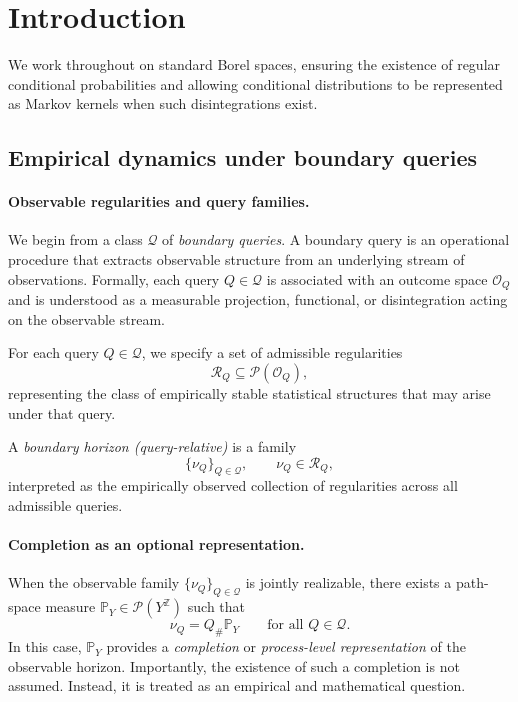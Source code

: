 \documentclass[11pt]{article}
\begin{document}
\tableofcontents

\section{Introduction}

We work throughout on standard Borel spaces, ensuring the existence of regular conditional
probabilities and allowing conditional distributions to be represented as Markov kernels when
such disintegrations exist.

\subsection{Empirical dynamics under boundary queries}

\paragraph{Observable regularities and query families.}
We begin from a class $\mathcal Q$ of \emph{boundary queries}.  
A boundary query is an operational procedure that extracts observable structure from an
underlying stream of observations.  Formally, each query $Q \in \mathcal Q$ is associated with
an outcome space $\mathcal O_Q$ and is understood as a measurable projection, functional, or
disintegration acting on the observable stream.

For each query $Q \in \mathcal Q$, we specify a set of admissible regularities
\[
\mathcal R_Q \subseteq \mathcal P(\mathcal O_Q),
\]
representing the class of empirically stable statistical structures that may arise under that
query.

A \emph{boundary horizon (query-relative)} is a family
\[
\{\nu_Q\}_{Q \in \mathcal Q}, \qquad \nu_Q \in \mathcal R_Q,
\]
interpreted as the empirically observed collection of regularities across all admissible
queries.

\paragraph{Completion as an optional representation.}
When the observable family $\{\nu_Q\}_{Q\in\mathcal Q}$ is jointly realizable, there exists a
path-space measure $\mathbb P_Y \in \mathcal P(Y^{\mathbb Z})$ such that
\[
\nu_Q = Q_\# \mathbb P_Y
\qquad \text{for all } Q \in \mathcal Q.
\]
In this case, $\mathbb P_Y$ provides a \emph{completion} or \emph{process-level representation}
of the observable horizon.  Importantly, the existence of such a completion is not assumed.
Instead, it is treated as an empirical and mathematical question.
\end{document}
